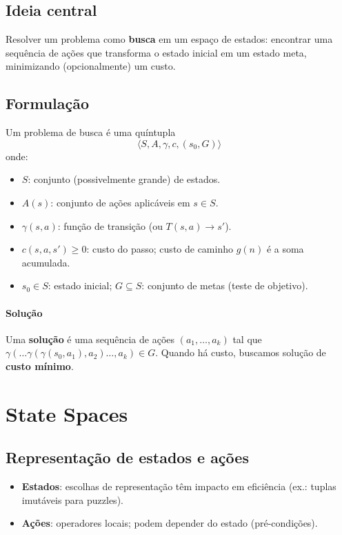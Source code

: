 \documentclass[9pt,a4paper]{extarticle}
\begin{document}
\subsection*{Ideia central}
Resolver um problema como \textbf{busca} em um espaço de estados: encontrar uma sequência de ações que transforma o estado inicial em um estado meta, minimizando (opcionalmente) um custo.

\subsection*{Formulação}
Um problema de busca é uma quíntupla
\[
\langle S, A, \gamma, c, (s_0,G) \rangle
\]
onde:
\begin{itemize}
  \item $S$: conjunto (possivelmente grande) de estados.
  \item $A(s)$: conjunto de ações aplicáveis em $s \in S$.
  \item $\gamma(s,a)$: função de transição (ou $T(s,a)\to s'$).
  \item $c(s,a,s') \ge 0$: custo do passo; custo de caminho $g(n)$ é a soma acumulada.
  \item $s_0 \in S$: estado inicial; $G \subseteq S$: conjunto de metas (teste de objetivo).
\end{itemize}

\paragraph{Solução}
Uma \textbf{solução} é uma sequência de ações $(a_1,\dots,a_k)$ tal que $\gamma(\dots\gamma(\gamma(s_0,a_1),a_2)\dots,a_k) \in G$.  
Quando há custo, buscamos solução de \textbf{custo mínimo}.

\section{State Spaces}

\subsection*{Representação de estados e ações}
\begin{itemize}
  \item \textbf{Estados}: escolhas de representação têm impacto em eficiência (ex.: tuplas imutáveis para puzzles).
  \item \textbf{Ações}: operadores locais; podem depender do estado (pré-condições).
\end{itemize}
\end{document}
